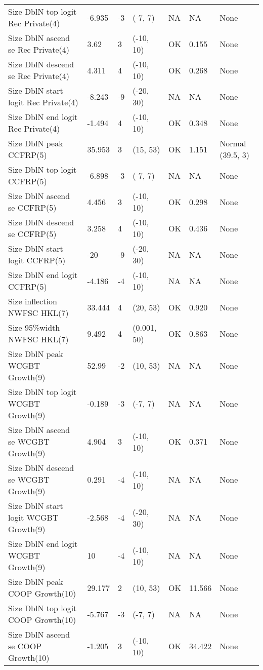 \documentclass[11pt,
  english,
  letterpaper,
]{article}
\begin{document}
\begin{landscape}
\begin{longtable}[t]{>{\raggedright\arraybackslash}p{7.5cm}lllll>{\raggedright\arraybackslash}p{3.5cm}}
Size DblN top logit Rec Private(4) & -6.935 & -3 & (-7, 7) & NA & NA & None\\
Size DblN ascend se Rec Private(4) & 3.62 & 3 & (-10, 10) & OK & 0.155 & None\\
Size DblN descend se Rec Private(4) & 4.311 & 4 & (-10, 10) & OK & 0.268 & None\\
Size DblN start logit Rec Private(4) & -8.243 & -9 & (-20, 30) & NA & NA & None\\
Size DblN end logit Rec Private(4) & -1.494 & 4 & (-10, 10) & OK & 0.348 & None\\
Size DblN peak CCFRP(5) & 35.953 & 3 & (15, 53) & OK & 1.151 & Normal (39.5, 3)\\
Size DblN top logit CCFRP(5) & -6.898 & -3 & (-7, 7) & NA & NA & None\\
Size DblN ascend se CCFRP(5) & 4.456 & 3 & (-10, 10) & OK & 0.298 & None\\
Size DblN descend se CCFRP(5) & 3.258 & 4 & (-10, 10) & OK & 0.436 & None\\
Size DblN start logit CCFRP(5) & -20 & -9 & (-20, 30) & NA & NA & None\\
Size DblN end logit CCFRP(5) & -4.186 & -4 & (-10, 10) & NA & NA & None\\
Size inflection NWFSC HKL(7) & 33.444 & 4 & (20, 53) & OK & 0.920 & None\\
Size 95\%width NWFSC HKL(7) & 9.492 & 4 & (0.001, 50) & OK & 0.863 & None\\
Size DblN peak WCGBT Growth(9) & 52.99 & -2 & (10, 53) & NA & NA & None\\
Size DblN top logit WCGBT Growth(9) & -0.189 & -3 & (-7, 7) & NA & NA & None\\
Size DblN ascend se WCGBT Growth(9) & 4.904 & 3 & (-10, 10) & OK & 0.371 & None\\
Size DblN descend se WCGBT Growth(9) & 0.291 & -4 & (-10, 10) & NA & NA & None\\
Size DblN start logit WCGBT Growth(9) & -2.568 & -4 & (-20, 30) & NA & NA & None\\
Size DblN end logit WCGBT Growth(9) & 10 & -4 & (-10, 10) & NA & NA & None\\
Size DblN peak COOP Growth(10) & 29.177 & 2 & (10, 53) & OK & 11.566 & None\\
Size DblN top logit COOP Growth(10) & -5.767 & -3 & (-7, 7) & NA & NA & None\\
Size DblN ascend se COOP Growth(10) & -1.205 & 3 & (-10, 10) & OK & 34.422 & None\\

\end{longtable}
\end{landscape}
\end{document}
